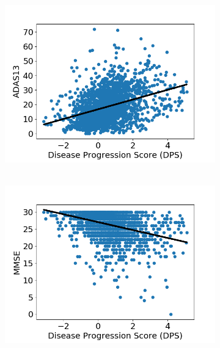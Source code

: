 \documentclass[8pt,xcolor=table]{beamer}
\begin{document}
\begin{frame}
\begin{figure}[h]
  \begin{subfigure}{0.22\textwidth}
    \centering
    \\ 
    \includegraphics[width=1.1\textwidth]{figures/stagingCogTestsScatterPlot_adniThFWHM0Initk-meansCl3Pr0Ra1Mrf5_VWDPMMean_ADAS13.png}
  \end{subfigure}
  \begin{subfigure}{0.22\textwidth}
    \centering
    \\ 
    \includegraphics[width=1.1\textwidth]{figures/stagingCogTestsScatterPlot_adniThFWHM0Initk-meansCl3Pr0Ra1Mrf5_VWDPMMean_MMSE.png}

\end{subfigure}
\end{figure}
\end{frame}
\end{document}
